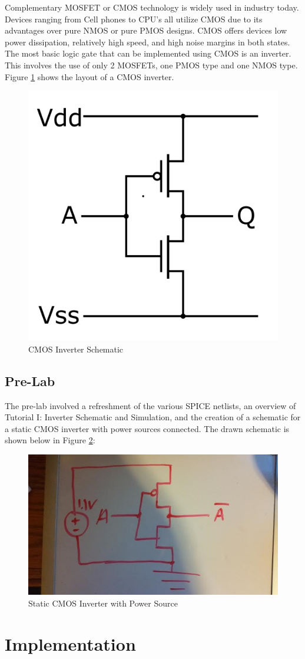 \documentclass[12pt]{article}
\begin{document}
Complementary MOSFET or CMOS technology is widely used in industry today. Devices ranging from Cell phones to CPU's all utilize CMOS due to its advantages over pure NMOS or pure PMOS designs. CMOS offers devices low power dissipation, relatively high speed, and high noise margins in both states. The most basic logic gate that can be implemented using CMOS is an inverter. This involves the use of only 2 MOSFETs, one PMOS type and one NMOS type. Figure \ref{fig:inverter} shows the layout of a CMOS inverter. 
\begin{figure}[H]
\centering
\includegraphics[width=0.4\linewidth]{inverter}
\caption{CMOS Inverter Schematic}
\label{fig:inverter}
\end{figure}


\subsection{Pre-Lab}
The pre-lab involved a refreshment of the various SPICE netlists, an overview of Tutorial I: Inverter Schematic and Simulation, and the creation of a schematic for a static CMOS inverter with power sources connected. The drawn schematic is shown below in Figure \ref{fig:prelab}:
\begin{figure}[H]
\centering
\includegraphics[width=0.5\linewidth]{prelab}
\caption{Static CMOS Inverter with Power Source}
\label{fig:prelab}
\end{figure}

\section{Implementation}
\end{document}
